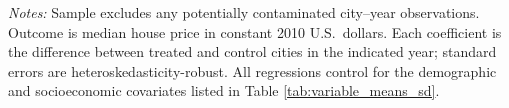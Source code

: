 \begin{table}[H]
\begin{threeparttable}
\begin{tabular}{p{4.5cm}ccccccc}
    \bottomrule
  \end{tabular}
  \begin{tablenotes}[flushleft]
    \small
    \item \textit{Notes:} Sample excludes any potentially contaminated city–year observations. Outcome is median house price in constant 2010 U.S.\ dollars. Each coefficient is the difference between treated and control cities in the indicated year; standard errors are heteroskedasticity-robust. All regressions control for the demographic and socioeconomic covariates listed in Table \ref{tab:variable_means_sd}. 
  \end{tablenotes}
  \end{threeparttable}
\end{table}



